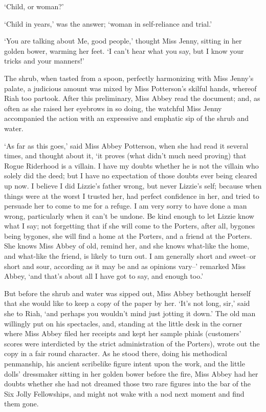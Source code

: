 ‘Child, or woman?’

‘Child in years,’ was the answer; ‘woman in self-reliance and trial.’

‘You are talking about Me, good people,’ thought Miss Jenny, sitting in
her golden bower, warming her feet. ‘I can’t hear what you say, but I
know your tricks and your manners!’

The shrub, when tasted from a spoon, perfectly harmonizing with Miss
Jenny’s palate, a judicious amount was mixed by Miss Potterson’s skilful
hands, whereof Riah too partook. After this preliminary, Miss Abbey read
the document; and, as often as she raised her eyebrows in so doing,
the watchful Miss Jenny accompanied the action with an expressive and
emphatic sip of the shrub and water.

‘As far as this goes,’ said Miss Abbey Potterson, when she had read it
several times, and thought about it, ‘it proves (what didn’t much need
proving) that Rogue Riderhood is a villain. I have my doubts whether he
is not the villain who solely did the deed; but I have no expectation of
those doubts ever being cleared up now. I believe I did Lizzie’s father
wrong, but never Lizzie’s self; because when things were at the worst I
trusted her, had perfect confidence in her, and tried to persuade her
to come to me for a refuge. I am very sorry to have done a man wrong,
particularly when it can’t be undone. Be kind enough to let Lizzie know
what I say; not forgetting that if she will come to the Porters, after
all, bygones being bygones, she will find a home at the Porters, and a
friend at the Porters. She knows Miss Abbey of old, remind her, and she
knows what-like the home, and what-like the friend, is likely to turn
out. I am generally short and sweet--or short and sour, according as it
may be and as opinions vary--’ remarked Miss Abbey, ‘and that’s about
all I have got to say, and enough too.’

But before the shrub and water was sipped out, Miss Abbey bethought
herself that she would like to keep a copy of the paper by her. ‘It’s
not long, sir,’ said she to Riah, ‘and perhaps you wouldn’t mind just
jotting it down.’ The old man willingly put on his spectacles, and,
standing at the little desk in the corner where Miss Abbey filed her
receipts and kept her sample phials (customers’ scores were interdicted
by the strict administration of the Porters), wrote out the copy in
a fair round character. As he stood there, doing his methodical
penmanship, his ancient scribelike figure intent upon the work, and the
little dolls’ dressmaker sitting in her golden bower before the fire,
Miss Abbey had her doubts whether she had not dreamed those two rare
figures into the bar of the Six Jolly Fellowships, and might not wake
with a nod next moment and find them gone.

